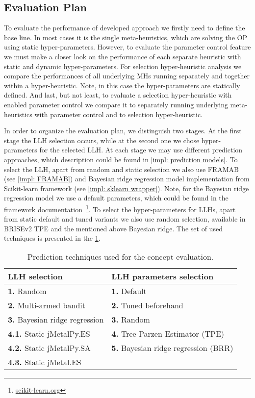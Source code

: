 \subsection{Evaluation Plan}\label{eval:1:plan}
To evaluate the performance of developed approach we firstly need to define the base line. In most cases it is the single meta-heuristics, which are solving the OP using static hyper-parameters. However, to evaluate the parameter control feature we must make a closer look on the performance of each separate heuristic with static and dynamic hyper-parameters. For selection hyper-heuristic analysis we compare the performances of all underlying MHs running separately and together within a hyper-heuristic. Note, in this case the hyper-parameters are statically defined. And last, but not least, to evaluate a selection hyper-heuristic with enabled parameter control we compare it to separately running underlying meta-heuristics with parameter control and to selection hyper-heuristic.

In order to organize the evaluation plan, we distinguish two stages.
At the first stage the LLH selection occurs, while at the second one we chose hyper-parameters for the selected LLH. At each stage we may use different prediction approaches, which description could be found in \cref{impl: prediction models}. To select the LLH, apart from random and static selection we also use FRAMAB (see \cref{impl: FRAMAB}) and Bayesian ridge regression model implementation from Scikit-learn framework (see \cref{impl: sklearn wrapper}). Note, for the Bayesian ridge regression model we use a default parameters, which could be found in the framework documentation~\footnote{\href{https://scikit-learn.org/stable/modules/generated/sklearn.linear_model.BayesianRidge.html}{scikit-learn.org}}. To select the hyper-parameters for LLHs, apart from static default and tuned variants we also use random selection, available in BRISEv2 TPE and the mentioned above Bayesian ridge. The set of used techniques is presented in the \cref{eval: concept settings table}.
\begin{table}[h!]
	\centering
	\begin{tabular}{l||l}
		\textbf{LLH selection} & \textbf{LLH parameters selection} \\
		\hline
		\hline
		\textbf{1.} Random & \textbf{1.} Default \\
		\textbf{2.} Multi-armed bandit & \textbf{2.} Tuned beforehand \\
		\textbf{3.} Bayesian ridge regression & \textbf{3.} Random \\
		\textbf{4.1.} Static jMetalPy.ES & \textbf{4.} Tree Parzen Estimator (TPE) \\
		\textbf{4.2.} Static jMetalPy.SA & \textbf{5.} Bayesian ridge regression (BRR) \\
		\textbf{4.3.} Static jMetal.ES & 
	\end{tabular}
	
	\caption{Prediction techniques used for the concept evaluation.}
	\label{eval: concept settings table}
\end{table}


